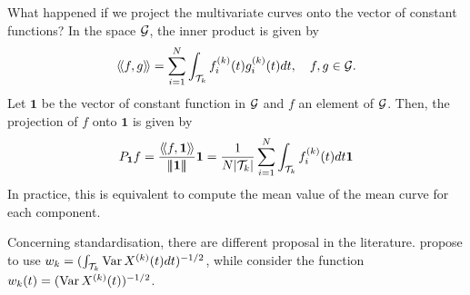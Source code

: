 \begin{remark}
What happened if we project the multivariate curves onto the vector of constant functions?
In the space $\mathcal{G}$, the inner product is given by
\begin{equation}
\langle\!\langle f, g\rangle\!\rangle = \sum_{i = 1}^N \int_{\mathcal{T}_{k}} f^{(k)}_i(t)g^{(k)}_i(t)dt, \quad f, g \in \mathcal{G}.
\end{equation} 
Let $\mathbf{1}$ be the vector of constant function in $\mathcal{G}$ and $f$ an element of $\mathcal{G}$. Then, the projection of $f$ onto $\mathbf{1}$ is given by
\begin{equation}
P_{\mathbf{1}}f = \frac{\langle\!\langle f, \mathbf{1}\rangle\!\rangle}{\left|\!\left|\!\left|\mathbf{1}\right|\!\right|\!\right|}\mathbf{1} = \frac{1}{N\lvert \mathcal{T}_{k} \rvert}\sum_{i = 1}^N \int_{\mathcal{T}_{k}} f^{(k)}_i(t)dt\mathbf{1}
\end{equation}
In practice, this is equivalent to compute the mean value of the mean curve for each component.
\end{remark}

Concerning standardisation, there are different proposal in the literature. \cite{happMultivariateFunctionalPrincipal2015} propose to use $w_k = (\int_{\mathcal{T}_{k}} \operatorname{Var} X^{(k)}(t)dt)^{-1/2}$, while \cite{chiouMultivariateFunctionalPrincipal2014} consider the function $w_k(t) = (\operatorname{Var} X^{(k)}(t))^{-1/2}$.


